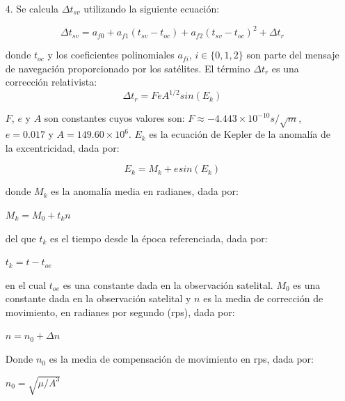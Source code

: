 {\begin{itemize}
donde $c$ es la velocidad de la luz: $c \approx 2.998 \times 10^{8} ms^{-1}$.

\item[4.] Se calcula $\Delta t_{sv}$ utilizando la siguiente ecuación:

\begin{equation}
\label{Eq:Deltat_sv}
\Delta t_{sv}= a_{f0} + a_{f1}(t_{sv}-t_{oc}) + a_{f2}(t_{sv}-t_{oc})^2 + \Delta t_{r}
\end{equation}

donde $t_{oc}$ y los coeficientes polinomiales $a_{fi}$, $i \in \lbrace0, 1, 2\rbrace$ son parte del mensaje de navegación proporcionado por los satélites. El término $\Delta t_{r}$ es una corrección relativista:\\

\begin{equation}
\label{Eq:Deltat_r}
\Delta t_r = FeA^{1/2}sin(E_{k})
\end{equation}

$F$, $e$ y $A$ son constantes cuyos valores son: $F \approx -4.443 \times 10^{-10} s/\sqrt{m}$, $e = 0.017$ y $A = 149.60 \times 10^{6}$. $E_{k}$ es la ecuación de Kepler de la anomalía de la excentricidad, dada por:

\begin{equation}
\label{Eq:Kepler}
E_k = M_k + esin(E_k)
\end{equation}

donde $M_k$ es la anomalía media en radianes, dada por: \\
\begin{center}
$M_k = M_0 + t_k n$\\
\end{center}

del que $t_k$ es el tiempo desde la época referenciada, dada por:\\
\begin{center}
$t_k = t - t_{oe}$\\
\end{center}

en el cual $t_{oe}$ es una constante dada en la observación satelital. $M_0$ es una constante dada en la observación satelital y $n$ es la media de corrección de movimiento, en radianes por segundo (rps), dada por:\\
\begin{center}
$n = n_0 + \Delta n$\\
\end{center}

Donde $n_0$ es la media de compensación de movimiento en rps, dada por:\\
\begin{center}
$n_0 = \sqrt{\mu / A^{3}}$\\ 
\end{center}


\end{itemize}}

